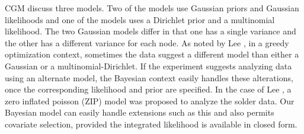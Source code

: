 \documentclass{article}
\renewcommand{\vec}[1]{\underline{{#1}}}
\begin{document}
%
% 
CGM discuss three models. Two of the models use Gaussian priors and Gaussian likelihoods and one of the models uses a Dirichlet prior and a multinomial likelihood. The two Gaussian models differ in that one has a single variance and the other has a different variance for each node. As noted by Lee \cite{lee2006decision}, in a greedy optimization context, sometimes the data suggest a different model than either a Gaussian or a multinomial-Dirichlet. If the experiment suggests analyzing data using an alternate model, the Bayesian context easily handles these alterations, once the corresponding likelihood and prior are specified. In the case of Lee \cite{lee2006decision}, a zero inflated poisson (ZIP) model was proposed to analyze the solder data. Our Bayesian model can easily handle extensions such as this and also permits covariate selection, provided the integrated likelihood is available in closed form.
\end{document}
